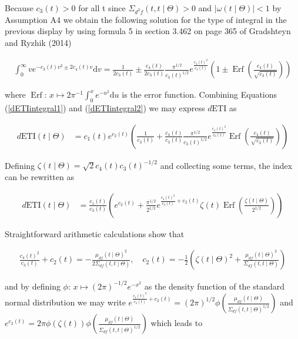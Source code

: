 \documentclass[11pt,]{article}
\DeclareMathOperator*{\Erf}{Erf}
\theoremstyle{nonumberplain}
\begin{document}
Because \(c_3(t) > 0\) for all t since
\(\Sigma_{d^2\!f}(t,t \mid \Theta) > 0\) and
\(|\omega(t \mid \Theta)| < 1\) by Assumption A4 we obtain the following
solution for the type of integral in the previous display by using
formula 5 in section 3.462 on page 365 of Gradshteyn and Ryzhik (2014)

\begin{align}
\int_{0}^\infty v e^{-c_3(t) v^2 \pm 2c_4(t) v}\mathrm{d}v = \frac{1}{2c_3(t)} \pm \frac{c_4(t)}{2c_3(t)}\frac{\pi^{1/2}}{c_3(t)^{1/2}}e^{\frac{c_4(t)^2}{c_3(t)}}\left(1 \pm \Erf\left(\frac{c_4(t)}{\sqrt{c_3(t)}}\right)\right)\label{dETIintegral2}
\end{align}

where \(\Erf\colon\, x \mapsto 2\pi^{-1}\int_0^x e^{-u^2}\mathrm{d}u\)
is the error function. Combining Equations (\ref{dETIintegral1}) and
(\ref{dETIintegral2}) we may express \(d\mathrm{ETI}\) as

\begin{align*}
d\mathrm{ETI}(t \mid \Theta) &= c_1(t) e^{c_2(t)}\left(\frac{1}{c_3(t)} + \frac{c_4(t)}{c_3(t)}\frac{\pi^{1/2}}{c_3(t)^{1/2}}e^{\frac{c_4(t)^2}{c_3(t)}}\Erf\left(\frac{c_4(t)}{\sqrt{c_3(t)}}\right)\right)
\end{align*}

Defining \(\zeta(t \mid \Theta) = \sqrt{2}c_4(t)c_3(t)^{-1/2}\) and
collecting some terms, the index can be rewritten as

\begin{align*}
d\mathrm{ETI}(t \mid \Theta) &= \frac{c_1(t)}{c_3(t)}\left(e^{c_2(t)} + \frac{\pi^{1/2}}{2^{1/2}} e^{\frac{c_4(t)^2}{c_3(t)} + c_2(t)} \zeta(t) \Erf\left(\frac{\zeta(t \mid \Theta)}{2^{1/2}}\right)\right)
\end{align*}

Straightforward arithmetic calculations show that

\begin{align*}
  \frac{c_4(t)^2}{c_3(t)} + c_2(t) = -\frac{\mu_{df}(t \mid \Theta)^2}{2\Sigma_{df}(t,t \mid \Theta)}, \quad c_2(t) = - \frac{1}{2}\left(\zeta(t \mid \Theta)^2 + \frac{\mu_{df}(t \mid \Theta)^2}{\Sigma_{df}(t,t \mid \Theta)}\right)
\end{align*}

and by defining \(\phi\colon\, x \mapsto (2\pi)^{-1/2}e^{-x^2}\) as the
density function of the standard normal distribution we may write
\(e^{\frac{c_4(t)^2}{c_3(t)} + c_2(t)} = (2\pi)^{1/2}\phi\left(\frac{\mu_{df}(t \mid \Theta)}{\Sigma_{df}(t,t \mid \Theta)^{1/2}}\right)\)
and
\(e^{c_2(t)} = 2\pi\phi(\zeta(t))\phi\left(\frac{\mu_{df}(t \mid \Theta)}{\Sigma_{df}(t,t \mid \Theta)^{1/2}}\right)\)
which leads to
\end{document}
